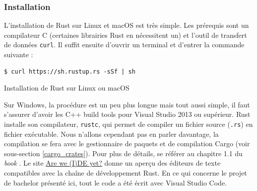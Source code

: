 \subsubsection{Installation}
L'installation de Rust sur Linux et macOS est très simple. Les prérequis sont un 
compilateur C (certaines librairies Rust en nécessitent un) et l'outil de transfert de données 
\texttt{curl}. Il suffit ensuite d'ouvrir un terminal et d'entrer la commande suivante :
\bigbreak
\begin{code}
    \begin{verbatim}
$ curl https://sh.rustup.rs -sSf | sh
    \end{verbatim}
    \caption{Installation de Rust sur Linux ou macOS}
\end{code}
\bigbreak
Sur Windows, la procédure est un peu plus longue mais tout aussi simple, il faut s'assurer d'avoir 
les C++ build tools pour Visual Studio 2013 ou supérieur. Rust installe son compilateur, 
\texttt{rustc}, qui permet de compiler un fichier source (\texttt{.rs}) en 
fichier exécutable. Nous n'allons cependant pas en parler davantage, la compilation se fera avec 
le gestionnaire de paquets et de compilation Cargo (voir sous-section \ref{cargo_crates}).
Pour plus de détails, se référer au chapitre 1.1 du \textit{book} \cite{ref0}.
Le site \href{https://areweideyet.com/}{Are we (I)DE yet?} \cite{ref1} donne un aperçu des éditeurs 
de texte compatibles avec la chaîne de développement Rust. En ce qui concerne le projet de bachelor 
présenté ici, tout le code a été écrit avec Visual Studio Code.

